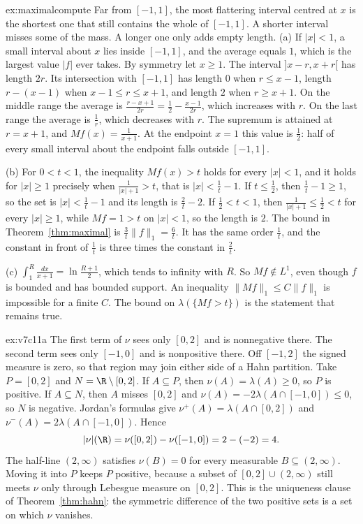\begin{solution}{ex:maximalcompute}
\idea Far from $[-1,1]$, the most flattering interval centred at $x$ is the shortest one that still contains the whole of $[-1,1]$. A shorter interval misses some of the mass. A longer one only adds empty length.
\writeup (a) If $|x|<1$, a small interval about $x$ lies inside $[-1,1]$, and the average equals $1$, which is the largest value $|f|$ ever takes. By symmetry let $x\ge1$. The interval $]x-r,x+r[$ has length $2r$. Its intersection with $[-1,1]$ has length $0$ when $r\le x-1$, length $r-(x-1)$ when $x-1\le r\le x+1$, and length $2$ when $r\ge x+1$. On the middle range the average is $\frac{r-x+1}{2r}=\frac12-\frac{x-1}{2r}$, which increases with $r$. On the last range the average is $\frac1r$, which decreases with $r$. The supremum is attained at $r=x+1$, and $Mf(x)=\frac1{x+1}$. At the endpoint $x=1$ this value is $\frac12$: half of every small interval about the endpoint falls outside $[-1,1]$.

(b) For $0<t<1$, the inequality $Mf(x)>t$ holds for every $|x|<1$, and it holds for $|x|\ge1$ precisely when $\frac1{|x|+1}>t$, that is $|x|<\frac1t-1$. If $t\le\frac12$, then $\frac1t-1\ge1$, so the set is $|x|<\frac1t-1$ and its length is $\frac2t-2$. If $\frac12<t<1$, then $\frac1{|x|+1}\le\frac12<t$ for every $|x|\ge1$, while $Mf=1>t$ on $|x|<1$, so the length is $2$. The bound in Theorem~\ref{thm:maximal} is $\frac3t\|f\|_1=\frac6t$. It has the same order $\frac1t$, and the constant in front of $\frac1t$ is three times the constant in $\frac2t$.

(c) $\int_1^R\frac{dx}{x+1}=\ln\frac{R+1}2$, which tends to infinity with $R$. So $Mf\notin L^1$, even though $f$ is bounded and has bounded support. An inequality $\|Mf\|_1\le C\|f\|_1$ is impossible for a finite $C$. The bound on $\lambda(\{Mf>t\})$ is the statement that remains true.
\end{solution}

\begin{solution}{ex:v7c11a}
\idea The first term of $\nu$ sees only $[0,2]$ and is nonnegative there. The second term sees only $[-1,0]$ and is nonpositive there. Off $[-1,2]$ the signed measure is zero, so that region may join either side of a Hahn partition.
\writeup Take $P=[0,2]$ and $N=\R\setminus[0,2]$. If $A\subseteq P$, then $\nu(A)=\lambda(A)\ge0$, so $P$ is positive. If $A\subseteq N$, then $A$ misses $[0,2]$ and $\nu(A)=-2\lambda(A\cap[-1,0])\le0$, so $N$ is negative. Jordan's formulas give $\nu^+(A)=\lambda(A\cap[0,2])$ and $\nu^-(A)=2\lambda(A\cap[-1,0])$. Hence
\[
|\nu|(\R)=\nu([0,2])-\nu([-1,0])=2-(-2)=4.
\]
The half-line $(2,\infty)$ satisfies $\nu(B)=0$ for every measurable $B\subseteq(2,\infty)$. Moving it into $P$ keeps $P$ positive, because a subset of $[0,2]\cup(2,\infty)$ still meets $\nu$ only through Lebesgue measure on $[0,2]$. This is the uniqueness clause of Theorem~\ref{thm:hahn}: the symmetric difference of the two positive sets is a set on which $\nu$ vanishes.
\end{solution}

